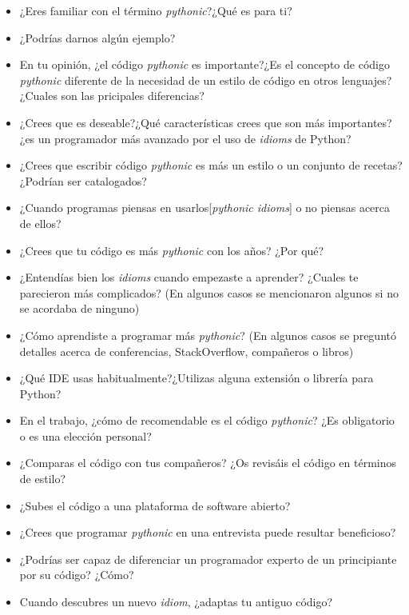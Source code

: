 \documentclass[a4paper, 12pt]{book}
\begin{document}
 \begin{itemize}
     \item ¿Eres familiar con el término \textit{pythonic}?¿Qué es para ti?
     \item ¿Podrías darnos algún ejemplo?
     \item En tu opinión, ¿el código \textit{pythonic} es importante?¿Es el concepto de código \textit{pythonic} diferente de la necesidad de un estilo de código en otros lenguajes?¿Cuales son las pricipales diferencias?
     \item ¿Crees que es deseable?¿Qué características crees que son más importantes?¿es un programador más avanzado por el uso de \textit{idioms} de Python?
     \item ¿Crees que escribir código \textit{pythonic} es más un estilo o un conjunto de recetas? ¿Podrían ser catalogados?
     \item ¿Cuando programas piensas en usarlos[\textit{pythonic idioms}] o no piensas acerca de ellos?
     \item ¿Crees que tu código es más \textit{pythonic} con los años? ¿Por qué?
     \item ¿Entendías bien los \textit{idioms} cuando empezaste a aprender? ¿Cuales te parecieron más complicados? (En algunos casos se mencionaron algunos si no se acordaba de ninguno)
     \item ¿Cómo aprendiste a programar más \textit{pythonic}? (En algunos casos se preguntó detalles acerca de conferencias, StackOverflow, compañeros o libros)
     \item ¿Qué IDE usas habitualmente?¿Utilizas alguna extensión o librería para Python?
     \item En el trabajo, ¿cómo de recomendable es el código \textit{pythonic}? ¿Es obligatorio o es una elección personal?
     \item ¿Comparas el código con tus compañeros? ¿Os revisáis el código en términos de estilo?
     \item ¿Subes el código a una plataforma de software abierto?
     \item ¿Crees que programar \textit{pythonic} en una entrevista puede resultar beneficioso?
     \item ¿Podrías ser capaz de diferenciar un programador experto de un principiante por su código? ¿Cómo?
     \item Cuando descubres un nuevo \textit{idiom}, ¿adaptas tu antiguo código?
 \end{itemize}
\end{document}

